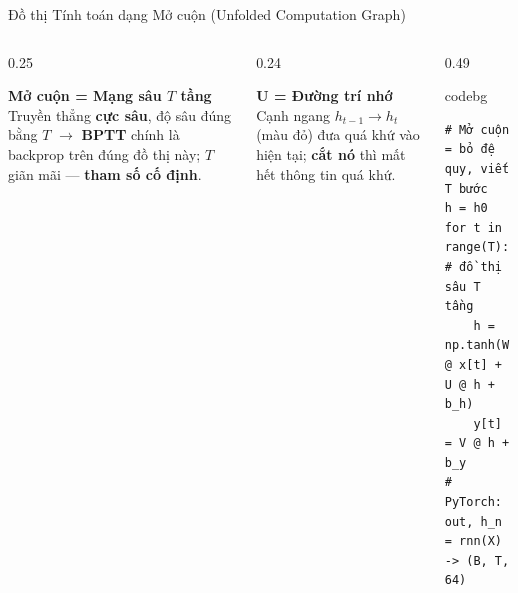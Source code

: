 \documentclass[aspectratio=169, 10pt]{beamer}
\newenvironment{codebox}{\begin{beamercolorbox}[sep=3pt, rounded=true]{codebg}\footnotesize\ttfamily}{\end{beamercolorbox}}
\begin{document}
\begin{frame}[fragile]{Đồ thị Tính toán dạng Mở cuộn (Unfolded Computation Graph)}
\vspace{0.06cm}
\begin{columns}[T]
\begin{column}{0.25\textwidth}
\begin{block}{\textbf{Mở cuộn = Mạng sâu \(T\) tầng}}
{\scriptsize Truyền thẳng \textbf{cực sâu}, độ sâu đúng bằng \(T\) \(\rightarrow\) \textbf{BPTT} chính là backprop trên đúng đồ thị này; \(T\) giãn mãi — \textbf{tham số cố định}.}
\end{block}
\end{column}
\begin{column}{0.24\textwidth}
\begin{alertblock}{\textbf{\(\mathbf{U}\) = Đường trí nhớ}}
{\scriptsize Cạnh ngang \(h_{t-1} \rightarrow h_t\) (màu đỏ) đưa quá khứ vào hiện tại; \textbf{cắt nó} thì mất hết thông tin quá khứ.}
\end{alertblock}
\end{column}
\begin{column}{0.49\textwidth}
\begin{codebox}\scriptsize
\begin{verbatim}
# Mở cuộn = bỏ đệ quy, viết T bước
h = h0
for t in range(T):   # đồ thị sâu T tầng
    h = np.tanh(W @ x[t] + U @ h + b_h)
    y[t] = V @ h + b_y
# PyTorch: out, h_n = rnn(X) -> (B, T, 64)
\end{verbatim}
\end{codebox}
\end{column}
\end{columns}
\end{frame}
\end{document}
